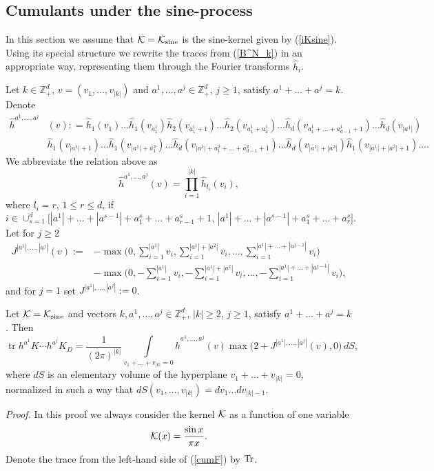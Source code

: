\documentclass{article}
\numberwithin{equation}{section}
\newcommand{\KK}{{\cal K}}
\newcommand{\tr}{\operatorname{tr}}
\newcommand{\fr}{\frac}
\newcommand{\sli}{\sum\limits}
\newcommand{\ili}{\int\limits}
\newcommand{\lbl}{\label}
\newcommand{\bee}{\begin{equation}}
\newcommand{\eee}{\end{equation}}
\newcommand{\bpp}{\begin{prop}}
\newcommand{\epp}{\end{prop}}
\newcommand{\non}{\nonumber}
\newcommand{\Zp}{\mathbb{Z}^d_+}
\begin{document}
\subsection{Cumulants under the sine-process}

In this section we assume that $\KK=\KK_{\rm{sine}}$ is the sine-kernel
given by (\ref{iKsine}).
Using its special structure we
rewrite the traces from (\ref{B^N_k})
in an appropriate way,
representing them
through the Fourier transforms $\hat h_i$.



Let $k\in\Zp$, $v=(v_1,\ldots,v_{|k|})$ and
$a^1,\ldots,a^j\in\Zp$, $j\geq 1$, satisfy $a^1+\ldots+a^j=k$.
Denote
\begin{align}
\non
\hat h^{a^1,\ldots,a^j}&(v):
=\hat h_1(v_1)\ldots \hat h_1(v_{a^1_1})
\hat h_2(v_{a^1_1+1})\ldots \hat h_2(v_{a^1_1+a^1_2})
\ldots
\hat h_d(v_{a^1_1+\ldots+ a^1_{d-1}+ 1})\ldots \hat h_d(v_{|a^1|})
\\\non
&\hat h_1(v_{|a^1|+1})\ldots \hat h_1(v_{|a^1| + a^2_1})
\ldots
\hat h_d(v_{|a^1|+ a^2_1+\ldots+ a^2_{d-1}+ 1})\ldots \hat h_d(v_{|a^1|+|a^2|})
\hat h_1(v_{|a^1|+|a^2|+1})\ldots.
\end{align}
We abbreviate the relation above as
\bee\lbl{l_i}
\hat h^{a^1,\ldots,a^j}(v) = \prod\limits_{i=1}^{|k|} \hat h_{l_{i}}(v_i),
\eee
where $l_i=r$, $1\leq r \leq d$, if
$$
i\in\cup_{s=1}^d
\big[|a^1|+\ldots+|a^{s-1}|+a^s_1+\ldots+a^s_{r-1}+1,\,
 |a^1|+\ldots+|a^{s-1}|+a^s_1+\ldots+a^s_{r}\big].
$$
Let for $j\geq 2$
\begin{align}\lbl{Ja}
J^{|a^1|,\ldots,|a^j|}(v)
:=&-\max\big(0,\sli_{i=1}^{|a^1|}v_i,\sli_{i=1}^{|a^1|+|a^2|}v_i,\ldots, \sli_{i=1}^{|a^1|+\ldots+|a^{j-1}|}v_i\big) \\ \non
&-\max\big(0,-\sli_{i=1}^{|a^1|}v_i,-\sli_{i=1}^{|a^1|+|a^2|}v_i,\ldots, -\sli_{i=1}^{|a^1|+\ldots+|a^{j-1}|}v_i\big),
\end{align}
and for $j=1$ set $J^{|a^1|,\ldots,|a^j|}:=0$.
\bpp\lbl{lem:cumF} Let $\KK=\KK_{\rm{sine}}$ and vectors
$k, a^1,\ldots,a^j\in\Zp$, $|k|\geq 2$, $j\geq 1$, satisfy $a^1+\ldots+ a^j=k$. Then
\bee\lbl{cumF}
\tr h^{a^1} K \cdots h^{a^j}K_D
=\fr{1}{(2\pi)^{|k|}}\ili_{v_1+\ldots+ v_{|k|}=0} \hat h^{a^1,\ldots,a^j}(v) \max\big(2 + J^{|a^1|,\ldots,|a^j|}(v), 0\big)  \, dS,
\eee
where $dS$ is an elementary volume of the hyperplane $v_1+\ldots+ v_{|k|}=0$,
normalized in such a way that
$dS(v_1,\ldots,v_{|k|})=dv_1\ldots dv_{|k|-1}$.
\epp
{\it Proof. }
In this proof
we always consider the kernel $\KK$
as a function of one variable
\bee\lbl{Ksine1}
\KK(x)=\fr{\sin x}{\pi x}.
\eee
Denote the trace from the left-hand side of (\ref{cumF}) by $\rm{Tr}$.
\end{document}
